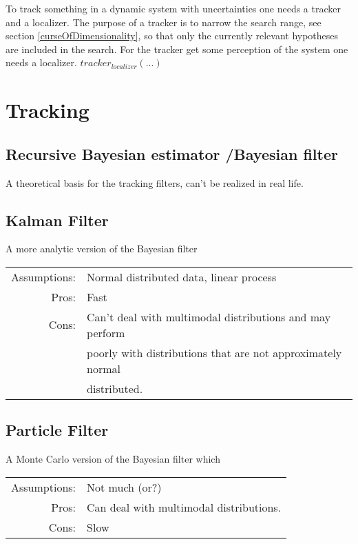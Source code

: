 
To track something in a dynamic system with uncertainties one needs a tracker and a localizer. The purpose of a tracker is to narrow the search range, see section \ref{curseOfDimensionality}, so that only the currently relevant hypotheses are included in the search. For the tracker get some perception of the system one needs a localizer. $tracker_{localizer}(...)$


\section{Tracking}
\subsection*{Recursive Bayesian estimator /Bayesian filter}
A theoretical basis for the tracking filters, can't be realized in real life.
\subsection{Kalman Filter}
A more analytic version of the Bayesian filter

\begin{tabular}[h]{rl}
Assumptions: & Normal distributed data, linear process\\ %
Pros: & Fast\\
Cons: & Can't deal with multimodal distributions and may perform\\
& poorly with distributions that are not approximately normal\\
& distributed.
\end{tabular}

\subsection*{Particle Filter}
A Monte Carlo version of the Bayesian filter which 

\begin{tabular}[h]{rl}
  Assumptions: & Not much (or?)\\
  Pros: & Can deal with multimodal distributions.\\
  Cons: & Slow
\end{tabular}

